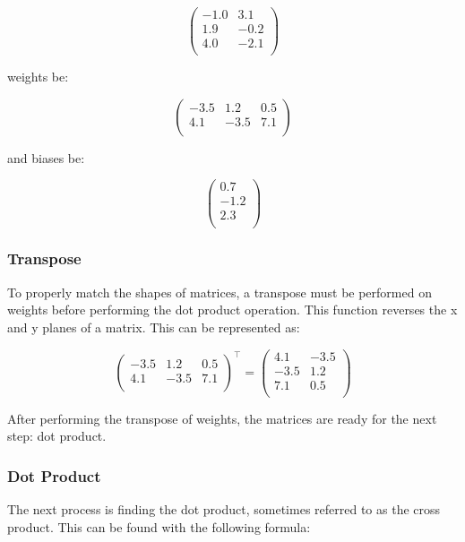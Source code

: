 \[
\begin{pmatrix} 
-1.0 & 3.1 \\
1.9 & -0.2 \\
4.0 & -2.1 \\
\end{pmatrix}
\]

weights be:

\[
\begin{pmatrix}
    -3.5 & 1.2 & 0.5\\
    4.1 & -3.5 & 7.1\\
\end{pmatrix}
\]

and biases be:

\[
\begin{pmatrix}
    0.7\\
    -1.2\\
    2.3\\
\end{pmatrix}
\]

\subsubsection*{Transpose}

To properly match the shapes of matrices, a transpose must be performed on weights before performing the dot product operation. This function reverses the x and y planes of a matrix. This can be represented as:

\[
\begin{pmatrix}
    -3.5 & 1.2 & 0.5\\
    4.1 & -3.5 & 7.1\\
\end{pmatrix}^\top
=
\begin{pmatrix}
    4.1 & -3.5\\
    -3.5 & 1.2\\
    7.1 & 0.5\\
\end{pmatrix}
\]

After performing the transpose of weights, the matrices are ready for the next step: dot product.

\subsubsection*{Dot Product}

The next process is finding the dot product, sometimes referred to as the cross product. This can be found with the following formula:

